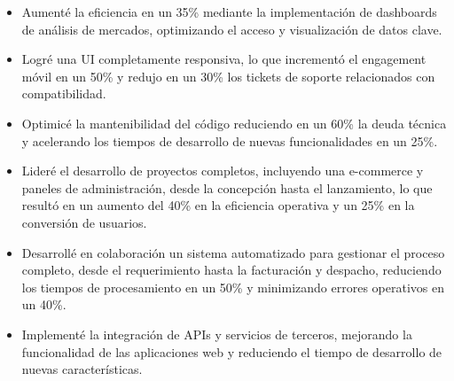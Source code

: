 \begin{itemize}
    \item Aumenté la eficiencia en un 35\% mediante la implementación de dashboards de análisis de mercados, optimizando el acceso y visualización de datos clave.
    \item Logré una UI completamente responsiva, lo que incrementó el engagement móvil en un 50\% y redujo en un 30\% los tickets de soporte relacionados con compatibilidad.
    \item Optimicé la mantenibilidad del código reduciendo en un 60\% la deuda técnica y acelerando los tiempos de desarrollo de nuevas funcionalidades en un 25\%.

\end{itemize}

\begin{itemize}
    \item Lideré el desarrollo de proyectos completos, incluyendo una e-commerce y paneles de administración, desde la concepción hasta el lanzamiento, lo que resultó en un aumento del 40\% en la eficiencia operativa y un 25\% en la conversión de usuarios.
    \item Desarrollé en colaboración un sistema automatizado para gestionar el proceso completo, desde el requerimiento hasta la facturación y despacho, reduciendo los tiempos de procesamiento en un 50\% y minimizando errores operativos en un 40\%.
    \item Implementé la integración de APIs y servicios de terceros, mejorando la funcionalidad de las aplicaciones web y reduciendo el tiempo de desarrollo de nuevas características.
\end{itemize}

